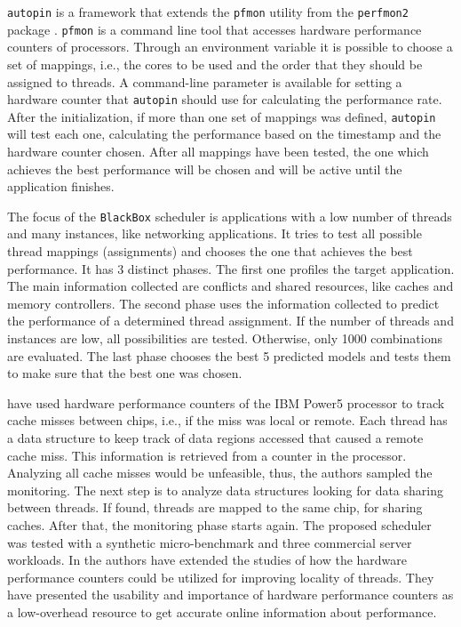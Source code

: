 \texttt{autopin} \cite{Klug:2011} is a framework that extends the \texttt{pfmon} utility from the \texttt{perfmon2} package \cite{Eranian:2005}. \texttt{pfmon} is a command line tool that accesses hardware performance counters of processors. Through an environment variable it is possible to choose a set of mappings, i.e., the cores to be used and the order that they should be assigned to threads. A command-line parameter is available for setting a hardware counter that \texttt{autopin} should use for calculating the performance rate. After the initialization, if more than one set of mappings was defined, \texttt{autopin} will test each one, calculating the performance based on the timestamp and the hardware counter chosen. After all mappings have been tested, the one which achieves the best performance will be chosen and will be active until the application finishes. 

The focus of the \texttt{BlackBox} scheduler \cite{Radojkovic:2013} is applications with a low number of threads and many instances, like networking applications. It tries to test all possible thread mappings (assignments) and chooses the one that achieves the best performance. It has 3 distinct phases. The first one profiles the target application. The main information collected are conflicts and shared resources, like caches and memory controllers. The second phase uses the information collected to predict the performance of a determined thread assignment. If the number of threads and instances are low, all possibilities are tested. Otherwise, only 1000 combinations are evaluated. The last phase chooses the best 5 predicted models and tests them to make sure that the best one was chosen.

 have used hardware performance counters of the IBM Power5 processor to track cache misses between chips, i.e., if the miss was local or remote. Each thread has a data structure to keep track of data regions accessed that caused a remote cache miss. This information is retrieved from a counter in the processor. Analyzing all cache misses would be unfeasible, thus, the authors sampled the monitoring. The next step is to analyze data structures looking for data sharing between threads. If found, threads are mapped to the same chip, for sharing caches. After that, the monitoring phase starts again. The proposed scheduler was tested with a synthetic micro-benchmark and three commercial server workloads. In  the authors have extended the studies of how the hardware performance counters could be utilized for improving locality of threads. They have presented the usability and importance of hardware performance counters as a low-overhead resource to get accurate online information about performance.

